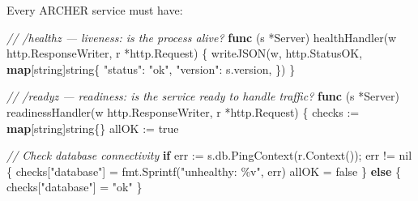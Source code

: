 \documentclass[
]{article}
\newenvironment{Shaded}{}{}
\newcommand{\CommentTok}[1]{\textcolor[rgb]{0.38,0.63,0.69}{\textit{#1}}}
\newcommand{\ControlFlowTok}[1]{\textcolor[rgb]{0.00,0.44,0.13}{\textbf{#1}}}
\newcommand{\DataTypeTok}[1]{\textcolor[rgb]{0.56,0.13,0.00}{#1}}
\newcommand{\KeywordTok}[1]{\textcolor[rgb]{0.00,0.44,0.13}{\textbf{#1}}}
\newcommand{\NormalTok}[1]{#1}
\newcommand{\OperatorTok}[1]{\textcolor[rgb]{0.40,0.40,0.40}{#1}}
\newcommand{\OtherTok}[1]{\textcolor[rgb]{0.00,0.44,0.13}{#1}}
\newcommand{\StringTok}[1]{\textcolor[rgb]{0.25,0.44,0.63}{#1}}
\begin{document}
Every ARCHER service must have:

\begin{Shaded}
\begin{Highlighting}[]
\CommentTok{// /healthz — liveness: is the process alive?}
\KeywordTok{func} \OperatorTok{(}\NormalTok{s }\OperatorTok{*}\NormalTok{Server}\OperatorTok{)}\NormalTok{ healthHandler}\OperatorTok{(}\NormalTok{w http}\OperatorTok{.}\NormalTok{ResponseWriter}\OperatorTok{,}\NormalTok{ r }\OperatorTok{*}\NormalTok{http}\OperatorTok{.}\NormalTok{Request}\OperatorTok{)} \OperatorTok{\{}
\NormalTok{    writeJSON}\OperatorTok{(}\NormalTok{w}\OperatorTok{,}\NormalTok{ http}\OperatorTok{.}\NormalTok{StatusOK}\OperatorTok{,} \KeywordTok{map}\OperatorTok{[}\DataTypeTok{string}\OperatorTok{]}\DataTypeTok{string}\OperatorTok{\{}
        \StringTok{"status"}\OperatorTok{:}  \StringTok{"ok"}\OperatorTok{,}
        \StringTok{"version"}\OperatorTok{:}\NormalTok{ s}\OperatorTok{.}\NormalTok{version}\OperatorTok{,}
    \OperatorTok{\})}
\OperatorTok{\}}

\CommentTok{// /readyz — readiness: is the service ready to handle traffic?}
\KeywordTok{func} \OperatorTok{(}\NormalTok{s }\OperatorTok{*}\NormalTok{Server}\OperatorTok{)}\NormalTok{ readinessHandler}\OperatorTok{(}\NormalTok{w http}\OperatorTok{.}\NormalTok{ResponseWriter}\OperatorTok{,}\NormalTok{ r }\OperatorTok{*}\NormalTok{http}\OperatorTok{.}\NormalTok{Request}\OperatorTok{)} \OperatorTok{\{}
\NormalTok{    checks }\OperatorTok{:=} \KeywordTok{map}\OperatorTok{[}\DataTypeTok{string}\OperatorTok{]}\DataTypeTok{string}\OperatorTok{\{\}}
\NormalTok{    allOK }\OperatorTok{:=} \OtherTok{true}

    \CommentTok{// Check database connectivity}
    \ControlFlowTok{if}\NormalTok{ err }\OperatorTok{:=}\NormalTok{ s}\OperatorTok{.}\NormalTok{db}\OperatorTok{.}\NormalTok{PingContext}\OperatorTok{(}\NormalTok{r}\OperatorTok{.}\NormalTok{Context}\OperatorTok{());}\NormalTok{ err }\OperatorTok{!=} \OtherTok{nil} \OperatorTok{\{}
\NormalTok{        checks}\OperatorTok{[}\StringTok{"database"}\OperatorTok{]} \OperatorTok{=}\NormalTok{ fmt}\OperatorTok{.}\NormalTok{Sprintf}\OperatorTok{(}\StringTok{"unhealthy: \%v"}\OperatorTok{,}\NormalTok{ err}\OperatorTok{)}
\NormalTok{        allOK }\OperatorTok{=} \OtherTok{false}
    \OperatorTok{\}} \ControlFlowTok{else} \OperatorTok{\{}
\NormalTok{        checks}\OperatorTok{[}\StringTok{"database"}\OperatorTok{]} \OperatorTok{=} \StringTok{"ok"}
    \OperatorTok{\}}


\end{Highlighting}
\end{Shaded}
\end{document}
